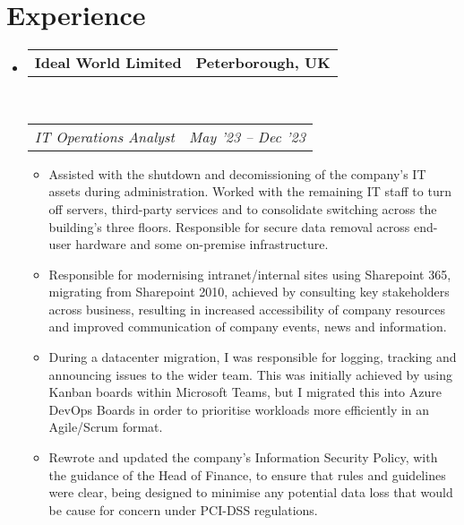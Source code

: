 \documentclass[10pt,a4paper]{article}
\makeatletter
\newcommand{\headerrow}[2]
{\begin{tabular*}{\linewidth}{l@{\extracolsep{\fill}}r}
	#1 &
	#2 \\
\end{tabular*}}
\makeatother
\begin{document}
\section{Experience}
\begin{itemize}
	\parskip=0.1em

	\item
	\headerrow
		{\textbf{Ideal World Limited}}
		{\textbf{Peterborough, UK}}
	\\
	\headerrow
		{\emph{IT Operations Analyst}}
		{\emph{May '23 -- Dec '23}}
	\begin{itemize}
		\item Assisted with the shutdown and decomissioning of the company's IT assets during administration. Worked with the remaining IT staff to turn off servers, third-party services and to consolidate switching across the building's three floors. Responsible for secure data removal across end-user hardware and some on-premise infrastructure.
		\item Responsible for modernising intranet/internal sites using Sharepoint 365, migrating from Sharepoint 2010, achieved by consulting key stakeholders across business, resulting in increased accessibility of company resources and improved communication of company events, news and information.
		\item During a datacenter migration, I was responsible for logging, tracking and announcing issues to the wider team. This was initially achieved by using Kanban boards within Microsoft Teams, but I migrated this into Azure DevOps Boards in order to prioritise workloads more efficiently in an Agile/Scrum format.
		\item Rewrote and updated the company's Information Security Policy, with the guidance of the Head of Finance, to ensure that rules and guidelines were clear, being designed to minimise any potential data loss that would be cause for concern under PCI-DSS regulations.
	\end{itemize}


\end{itemize}
\end{document}
